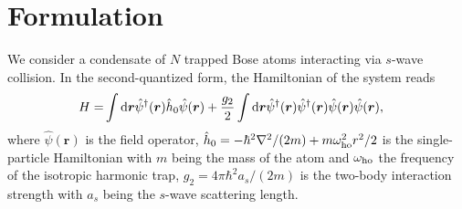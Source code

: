 \documentclass[pra,twocolumn,preprintnumbers,superscriptaddress,longbibliography,showkeys]{revtex4-1}
\begin{document}
\section{F\lowercase{ormulation}}\label{secform}
We consider a condensate of $N$ trapped Bose atoms interacting via $s$-wave collision. In the second-quantized form, the Hamiltonian of the system reads
\begin{align}
H =& \int {\rm d}{\bm r} \hat{\psi}^{\dagger}({\bm r}) \hat h_{0} \hat{\psi}({\bm r}) + \frac{g_{2}}{2} \int {\rm d}{\bm r} \hat{\psi}^{\dagger}({\bm r}) \hat{\psi}^{\dagger}({\bm r}) \hat{\psi}({\bm r}) \hat{\psi}({\bm r}),\label{hamil}
\end{align}
where $\hat{\psi}({\bm r})$ is the field operator, $\hat h_{0}=- \hbar^{2} \nabla^{2} / (2m) +m \omega_{\rm ho}^{2} r^{2} /2$ is the single-particle Hamiltonian with $m$ being the mass of the atom and $\omega_{\rm ho}$ the frequency of the isotropic harmonic trap, $g_{2} = 4 \pi \hbar^{2} a_{s} / (2m)$ is the two-body interaction strength with $a_s$ being the $s$-wave scattering length.
\end{document}
